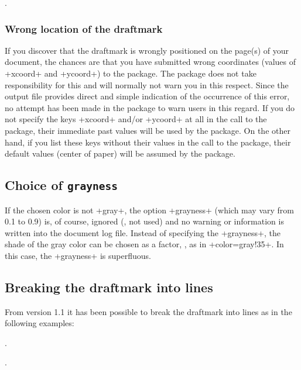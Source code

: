\documentclass[a4paper,11pt,final]{article}
\begin{document}
\begin{dmverbatim}
.
\end{dmverbatim}

\subsubsection{Wrong location of the draftmark}
If you discover that the draftmark is wrongly positioned on the page(s) of your document, the chances are that you have submitted wrong coordinates (values of +xcoord+ and +ycoord+) to the package. The package does not take responsibility for this and will normally not warn you in this respect. Since the output file provides direct and simple indication of the occurrence of this error, no attempt has been made in the package to warn users in this regard. If you do not specify the keys +xcoord+ and/or +ycoord+ at all in the call to the package, their immediate past values will be used by the package. On the other hand, if you list these keys without their values in the call to the package, their default values (center of paper) will be assumed by the package.

\subsection{Choice of \texttt{grayness}}
If the chosen color is not +gray+, the option +grayness+ (which may vary from 0.1 to 0.9) is, of course, ignored (\ie, not used) and no warning or information is written into the document log file. Instead of specifying the +grayness+, the shade of the gray color can be chosen as a factor, \eg, as in +color=gray!35+. In this case, the +grayness+ is superfluous.

\subsection{Breaking the draftmark into lines}\label{sec:Breakin-draftma}
From version 1.1 it has been possible to break the draftmark into lines as in the following examples:

\begin{dmverbatim}
.

.
\end{dmverbatim}
\end{document}

